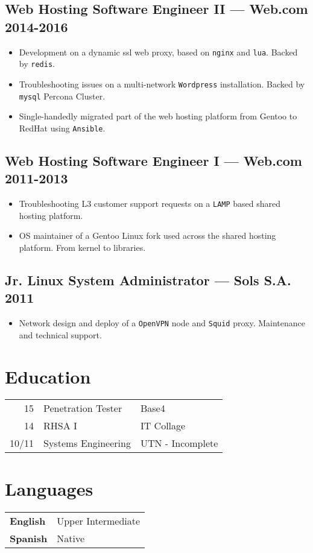\documentclass[11pt]{article}
\begin{document}
\subsection{Web Hosting Software Engineer II --- Web.com \hfill 2014-2016}
\begin{itemize}
\item Development on a dynamic ssl web proxy, based on \texttt{nginx} and \texttt{lua}. Backed by \texttt{redis}.
\item Troubleshooting issues on a multi-network \texttt{Wordpress} installation. Backed by \texttt{mysql} Percona Cluster.
\item Single-handedly migrated part of the web hosting platform from Gentoo to RedHat using \texttt{Ansible}.
\end{itemize}

\subsection{Web Hosting Software Engineer I --- Web.com \hfill 2011-2013}
\begin{itemize}
\item Troubleshooting L3 customer support requests on a \texttt{LAMP} based shared hosting platform.
\item OS maintainer of a Gentoo Linux fork used across the shared hosting platform. From kernel to libraries.
\end{itemize}

\subsection{Jr. Linux System Administrator --- Sols S.A. \hfill 2011}
\begin{itemize}
\item Network design and deploy of a \texttt{OpenVPN} node and \texttt{Squid} proxy. Maintenance and technical support.
\end{itemize}

\begin{multicols}{2}
  \section{Education}
    \begin{tabular}{ r | p{} | l }
      15    & Penetration Tester  & Base4 \\
      14    & RHSA I              & IT Collage \\
      10/11 & Systems Engineering & UTN - Incomplete
    \end{tabular}
  \columnbreak
  \section{Languages}
  \begin{tabular}{ l l }
    \hspace{.1em} \textbf{English} & Upper Intermediate \\
    \hspace{.1em} \textbf{Spanish} & Native
  \end{tabular}
\end{multicols}
\end{document}
